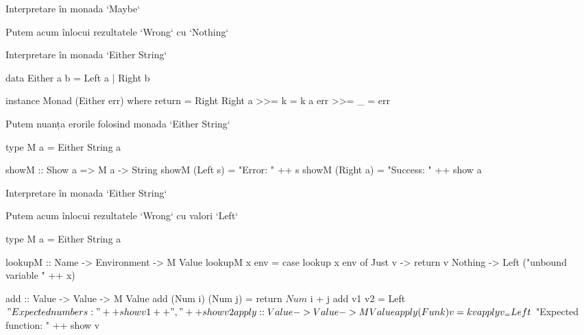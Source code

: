 \documentclass[xcolor=pdftex,romanian,colorlinks]{beamer}
\begin{document}
\begin{frame}[fragile]{Interpretare în monada `Maybe`}


Putem acum înlocui rezultatele `Wrong` cu `Nothing`


\end{frame}

\begin{frame}[fragile]{Interpretare în monada `Either String`}

\begin{asciihs}
data Either a b = Left a | Right b

instance Monad (Either err) where
  return = Right
  Right a >>= k  = k a
  err     >>= _  = err
\end{asciihs}

Putem nuanța erorile folosind monada `Either String`

\begin{asciihs}
type M a = Either String a

showM :: Show a => M a -> String
showM (Left s)  = "Error: " ++ s
showM (Right a) = "Success: " ++ show a
\end{asciihs}
\end{frame}

\begin{frame}[fragile]{Interpretare în monada `Either String`}

\medskip
Putem acum înlocui rezultatele `Wrong` cu valori `Left`

\begin{asciihs}
type M a = Either String a

lookupM :: Name -> Environment -> M Value
lookupM x env = case lookup x env of
  Just v  -> return v
  Nothing -> Left ("unbound variable " ++ x)

add :: Value -> Value -> M Value
add (Num i) (Num j) = return $ Num $ i + j
add v1 v2           = Left $
  "Expected numbers: " ++ show v1 ++ ", " ++ show v2

apply :: Value -> Value -> M Value
apply (Fun k) v = k v
apply v _       = Left $
  "Expected function: " ++ show v
\end{asciihs}
\end{frame}
\end{document}
